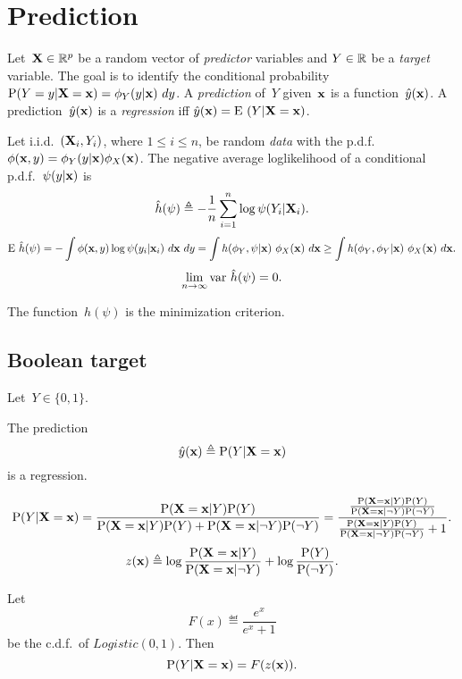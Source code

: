 \documentclass[10pt,a4paper]{article}
\theoremstyle{plain} \newtheorem{Lem}{Lemma}
\begin{document}
\section{Prediction}

Let~$\mathbf X \in \mathbb R^p$ be a random vector of {\em predictor} variables and $Y \in \mathbb R$ be a {\em target} variable.
The goal is to identify the conditional probability $\P(Y=y|\ve X = \ve x) = \phi_Y(y|\ve x) \ dy$.
A {\em prediction} of~$Y$ given~$\mathbf x$ is a function~$\hat y(\mathbf x)$.
A prediction~$\hat y(\mathbf x)$ is a {\em regression} iff $\hat y(\mathbf x) = \mathrm E \  (Y|\mathbf X = \mathbf x)$.

Let i.i.d.~$(\mathbf X_i, Y_i)$, where $1 \le i \le n$, be random {\em data} with the p.d.f.~$\phi(\mathbf x,y) = \phi_Y(y|\mathbf x) \phi_X(\mathbf x)$.
The negative average loglikelihood of a conditional p.d.f.~$\psi(y|\mathbf x)$ is
$$ \hat h(\psi) \triangleq - \frac 1 n \sum_{i=1}^n \log \psi(Y_i|\mathbf X_i). $$
$$ \mathrm E \  \hat h(\psi) = - \int \phi(\mathbf x,y) \log \psi(y_i|\mathbf x_i) \ d \mathbf x \ d y 
     =   \int h(\phi_Y, \psi | \mathbf x) \ \phi_X(\mathbf x) \ d \mathbf x
     \ge \int h(\phi_Y, \phi_Y | \mathbf x) \ \phi_X(\mathbf x) \ d \mathbf x.
$$
$$ \lim_{n \to \infty} \mathrm {var} \  \hat h(\psi) = 0. $$

The function~$\hat h(\psi)$ is the minimization criterion.


\subsection{Boolean target}

Let~$Y \in \{0,1\}$.

The prediction 
$$ \hat y(\mathbf x) \triangleq \mathrm P(Y|\mathbf X = \mathbf x) $$
is a regression.
 
\begin{equation*}
\begin{split}
\mathrm P(Y|\mathbf X = \mathbf x) 
  = \frac {\mathrm P(\mathbf X = \mathbf x|Y) \mathrm P(Y)} {\mathrm P(\mathbf X = \mathbf x|Y) \mathrm P(Y) + \mathrm P(\mathbf X = \mathbf x|\neg Y) \mathrm P(\neg Y)} 
  = \frac {\frac {\mathrm P(\mathbf X = \mathbf x|Y) \mathrm P(Y)} 
                  {\mathrm P(\mathbf X = \mathbf x|\neg Y) \mathrm P(\neg Y)}
           }
           {\frac {\mathrm P(\mathbf X = \mathbf x|Y) \mathrm P(Y)} 
                  {\mathrm P(\mathbf X = \mathbf x|\neg Y) \mathrm P(\neg Y)}
            + 1
           }.
\end{split}
\end{equation*}
$$ z(\mathbf x) \triangleq   \log \frac {\mathrm P(\mathbf X = \mathbf x|Y)} 
                                {\mathrm P(\mathbf X = \mathbf x|\neg Y)}
                   + \log \frac {\mathrm P(Y)} {\mathrm P(\neg Y)}. 
$$

Let
$$ F(x) \eqdef \frac {e^x} {e^x + 1} $$
be the c.d.f.~of $Logistic(0,1)$. 
Then
$$ \mathrm P(Y|\mathbf X = \mathbf x) = F(z(\mathbf x)). $$
\end{document}
